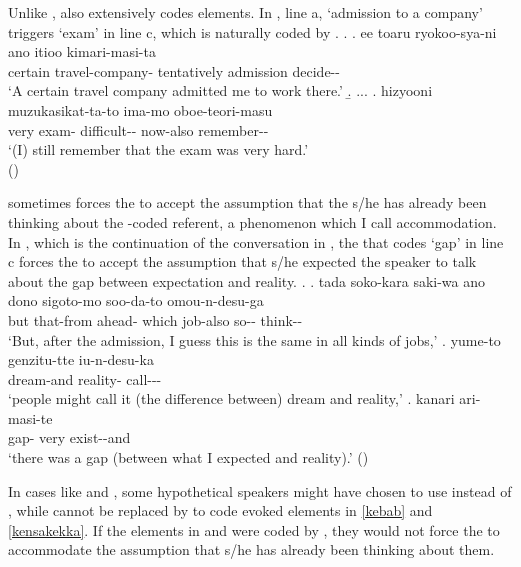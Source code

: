 Unlike ,
 also extensively codes  elements.
In \Next, line a,
 `admission to a company' triggers
 `exam' in line c,
which is naturally coded by .
%
\ex.\label{siken} \ag. ee toaru ryokoo-sya-ni ano itioo  kimari-masi-ta \\
		 certain travel-company-  tentatively admission decide-- \\
		`A certain travel company admitted me to work there.'
	\b. ...
	\bg. hizyooni  muzukasikat-ta-to ima-mo oboe-teori-masu \\
	very exam- difficult-- now-also remember-- \\
	`(I) still remember that the exam was very hard.' \\
\hfill{()}

 sometimes forces the  to accept the assumption that the s/he has already been thinking about the -coded referent, a phenomenon which I call {accommodation}.
In \Next, which is the continuation of the conversation in \Last,
the  that codes  `gap' in line c forces the  to accept the assumption that s/he expected the speaker to talk about the gap between expectation and reality.
%
\ex. \ag. tada soko-kara saki-wa ano dono sigoto-mo soo-da-to omou-n-desu-ga \\
	but that-from ahead-  which job-also so-- think-- \\
	`But, after the admission, I guess this is the same in all kinds of jobs,'
	\bg. yume-to genzitu-tte iu-n-desu-ka \\
		dream-and reality- call--- \\
		`people might call it (the difference between) dream and reality,'
	\bg.  kanari ari-masi-te \\
			gap- very exist--and \\
			`there was a gap (between what I expected and reality).'
\hfill{()}

In cases like \LLast and \Last,
some hypothetical speakers might have chosen to use 
instead of ,
while  cannot be replaced by 
to code evoked elements in \ref{kebab} and \ref{kensakekka}.
If the elements in \LLast and \Last were coded by ,
they would not force the  to accommodate the assumption that s/he has already been thinking about them.


